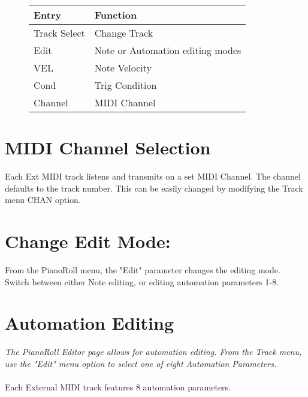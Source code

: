 \begin{figure}[hb]
    \begin{tabular}{|l|l|}
    \hline
    \rowcolor[HTML]{C0C0C0} 
    Entry        & Function \\ \hline
    Track Select & Change Track \\ \hline
    Edit         & Note or Automation editing modes\\ \hline
    VEL         & Note Velocity\\ \hline
    Cond        & Trig Condition\\ \hline
    Channel     & MIDI Channel\\ \hline
    \end{tabular}
\end{figure}
\section{MIDI Channel Selection}
Each Ext MIDI track listens and transmits on a set MIDI Channel. The channel defaults to the track number. This can be easily changed by modifying the Track  menu CHAN option.\\

\section{Change Edit Mode:}
From the PianoRoll menu, the "Edit" parameter changes the editing mode. Switch between either Note editing, or editing automation parameters 1-8.

\newpage
\section{Automation Editing}
\textit{The PianoRoll Editor page allows for automation editing. From the Track menu, use the "Edit" menu option to select one of eight Automation Parameters.}
\\\\
Each External MIDI track features 8 automation parameters.\\
